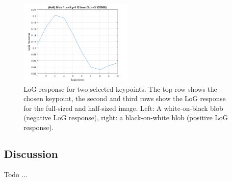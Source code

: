 \begin{figure}[h]
	\includegraphics[width=0.5\textwidth]{figures/a3_butterfly_log_half_2.png}
	\caption{LoG response for two selected keypoints. The top row shows the chosen keypoint, the second and third rows show the LoG response for the full-sized and half-sized image. Left: A white-on-black blob (negative LoG response), right: a black-on-white blob (positive LoG response).}
	\label{fig:a3:logresponse}
\end{figure}


\subsection{Discussion}

Todo ...
